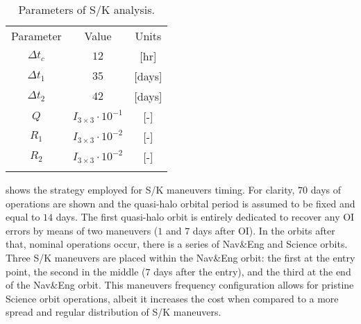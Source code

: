 %
%
\begin{table}[b!]
	\caption{Parameters of S/K analysis.}
	\label{tab:SKParameters}
	\centering
	\footnotesize
	\begin{tabular}{ccc}
		\TOPlines
		Parameter & Value & Units \\
		\MIDline
		$\Delta t_c$ & $12$ & [hr] \\
		$\Delta t_1$ & $35$ & [days] \\
		$\Delta t_2$ & $42$ & [days] \\				$Q$ & $I_{3\times3}\cdot10^{-1}$ & [-] \\
		$R_1$ & $I_{3\times3}\cdot10^{-2}$ & [-] \\
		$R_2$ & $I_{3\times3}\cdot10^{-2}$ & [-] \\
		\BOTTOMlines
	\end{tabular}
\end{table}
%

 shows the strategy employed for S/K maneuvers timing. For clarity, $70$ days of operations are shown and the quasi-halo orbital period is assumed to be fixed and equal to $14$ days. The first quasi-halo orbit is entirely dedicated to recover any {OI} errors by means of two maneuvers ($1$ and $7$ days after OI). In the orbits after that, nominal operations occur, \ie there is a series of Nav\&Eng and Science orbits. Three S/K maneuvers are placed within the Nav\&Eng orbit: the first at the entry point, the second in the middle (\ie $7$ days after the entry), and the third at the end of the Nav\&Eng orbit. This maneuvers frequency configuration allows for pristine Science orbit operations, albeit it increases the cost when compared to a more spread and regular distribution of S/K maneuvers.


